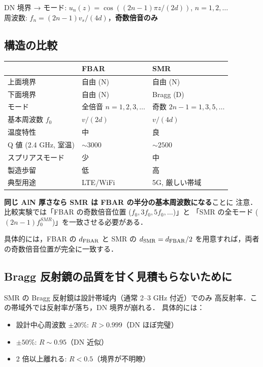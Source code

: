 \documentclass[11pt,a4paper]{article}
\begin{document}
DN 境界 → モード: $u_n(z) = \cos((2n-1)\pi z/(2d))$, $n=1,2,\ldots$\\
周波数: $f_n = (2n-1) v_s/(4d)$，\textbf{奇数倍音のみ}

\subsection{構造の比較}

\begin{center}
\begin{tabular}{lll}
\toprule
 & FBAR & SMR \\
\midrule
上面境界 & 自由 (N) & 自由 (N) \\
下面境界 & 自由 (N) & Bragg (D) \\
モード & 全倍音 $n=1,2,3,\ldots$ & 奇数 $2n-1=1,3,5,\ldots$ \\
基本周波数 $f_0$ & $v/(2d)$ & $v/(4d)$ \\
温度特性 & 中 & 良 \\
Q 値 (2.4 GHz, 室温) & $\sim 3000$ & $\sim 2500$ \\
スプリアスモード & 少 & 中 \\
製造歩留 & 低 & 高 \\
典型用途 & LTE/WiFi & 5G, 厳しい帯域 \\
\bottomrule
\end{tabular}
\end{center}

\textbf{同じ AlN 厚さなら SMR は FBAR の半分の基本周波数になる}ことに
注意．比較実験では「FBAR の奇数倍音位置 ($f_0, 3f_0, 5f_0,\ldots$)」と
「SMR の全モード ($(2n{-}1)f_0^{SMR}$)」を一致させる必要がある．

具体的には，FBAR の $d_{\rm FBAR}$ と SMR の $d_{\rm SMR} = d_{\rm FBAR}/2$
を用意すれば，両者の奇数倍音位置が完全に一致する．

\subsection{Bragg 反射鏡の品質を甘く見積もらないために}

SMR の Bragg 反射鏡は設計帯域内（通常 2--3 GHz 付近）でのみ
高反射率．この帯域外では反射率が落ち，DN 境界が崩れる．
具体的には：

\begin{itemize}
\item 設計中心周波数 $\pm 20\%$: $R > 0.999$（DN ほぼ完璧）
\item $\pm 50\%$: $R \sim 0.95$（DN 近似）
\item 2 倍以上離れる: $R < 0.5$（境界が不明瞭）
\end{itemize}
\end{document}
